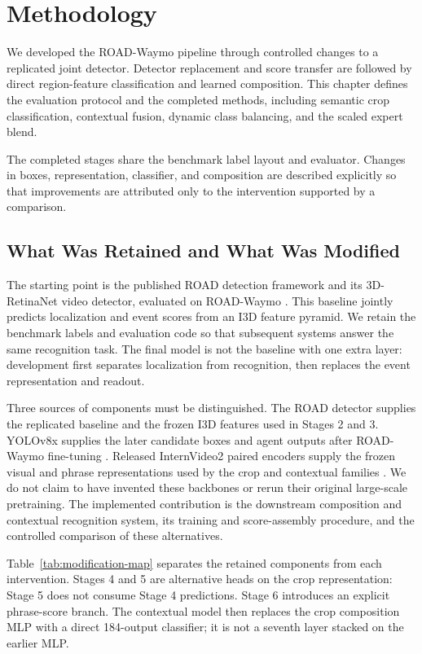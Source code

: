 \chapter{Methodology}

We developed the ROAD-Waymo pipeline through controlled changes to a replicated joint detector. Detector replacement and score transfer are followed by direct region-feature classification and learned composition. This chapter defines the evaluation protocol and the completed methods, including semantic crop classification, contextual fusion, dynamic class balancing, and the scaled expert blend.

The completed stages share the benchmark label layout and evaluator. Changes in boxes, representation, classifier, and composition are described explicitly so that improvements are attributed only to the intervention supported by a comparison.

\section{What Was Retained and What Was Modified}
\label{sec:baseline-modifications}

The starting point is the published ROAD detection framework and its 3D-RetinaNet video detector, evaluated on ROAD-Waymo \cite{road,road-waymo}. This baseline jointly predicts localization and event scores from an I3D feature pyramid. We retain the benchmark labels and evaluation code so that subsequent systems answer the same recognition task. The final model is not the baseline with one extra layer: development first separates localization from recognition, then replaces the event representation and readout.

Three sources of components must be distinguished. The ROAD detector supplies the replicated baseline and the frozen I3D features used in Stages 2 and 3. YOLOv8x supplies the later candidate boxes and agent outputs after ROAD-Waymo fine-tuning \cite{yolov8}. Released InternVideo2 paired encoders supply the frozen visual and phrase representations used by the crop and contextual families \cite{internvideo2,internvideo2-clip-s}. We do not claim to have invented these backbones or rerun their original large-scale pretraining. The implemented contribution is the downstream composition and contextual recognition system, its training and score-assembly procedure, and the controlled comparison of these alternatives.

Table~\ref{tab:modification-map} separates the retained components from each intervention. Stages 4 and 5 are alternative heads on the crop representation: Stage 5 does not consume Stage 4 predictions. Stage 6 introduces an explicit phrase-score branch. The contextual model then replaces the crop composition MLP with a direct 184-output classifier; it is not a seventh layer stacked on the earlier MLP.

